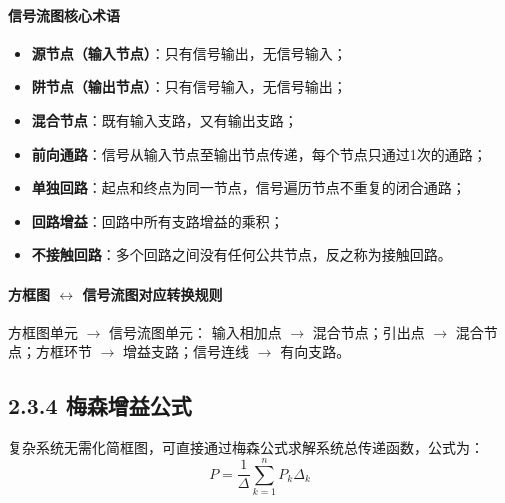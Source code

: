 \paragraph{信号流图核心术语}
\begin{itemize}
    \item \textbf{源节点（输入节点）}：只有信号输出，无信号输入；
    \item \textbf{阱节点（输出节点）}：只有信号输入，无信号输出；
    \item \textbf{混合节点}：既有输入支路，又有输出支路；
    \item \textbf{前向通路}：信号从输入节点至输出节点传递，每个节点只通过1次的通路；
    \item \textbf{单独回路}：起点和终点为同一节点，信号遍历节点不重复的闭合通路；
    \item \textbf{回路增益}：回路中所有支路增益的乘积；
    \item \textbf{不接触回路}：多个回路之间没有任何公共节点，反之称为接触回路。
\end{itemize}

\paragraph{方框图 $\leftrightarrow$ 信号流图对应转换规则}
方框图单元 $\rightarrow$ 信号流图单元：
输入相加点 $\rightarrow$ 混合节点；引出点 $\rightarrow$ 混合节点；方框环节 $\rightarrow$ 增益支路；信号连线 $\rightarrow$ 有向支路。

\subsection{2.3.4 梅森增益公式}
复杂系统无需化简框图，可直接通过梅森公式求解系统总传递函数，公式为：
\[
P = \frac{1}{\Delta} \sum_{k=1}^n P_k \Delta_k
\]

